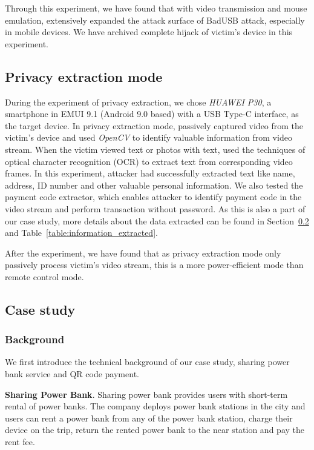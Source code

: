 Through this experiment, we have found that with video transmission and mouse emulation, \tool extensively expanded the attack surface of BadUSB attack, especially in mobile devices. We have archived complete hijack of victim's device in this experiment.

\subsection{Privacy extraction mode}
During the experiment of privacy extraction, we chose \textit{HUAWEI P30}, a smartphone in EMUI 9.1 (Android 9.0 based) with a USB Type-C interface, as the target device.
In privacy extraction mode, \tool passively captured video from the victim's device and used \textit{OpenCV} to identify valuable information from video stream.
When the victim viewed text or photos with text, \tool used the techniques of optical character recognition (OCR) to extract text from corresponding video frames.
In this experiment, attacker had successfully extracted text like name, address, ID number and other valuable personal information. We also tested the payment code extractor, which enables attacker to identify payment code in the video stream and perform transaction without password. As this is also a part of our case study, more details about the data extracted can be found in Section~\ref{subsec:case_study} and Table~\ref{table:information_extracted}.

After the experiment, we have found that as privacy extraction mode only passively process victim's video stream, this is a more power-efficient mode than remote control mode.

\subsection{Case study}
\label{subsec:case_study}
\subsubsection{Background}
We first introduce the technical background of our case study, sharing power bank service and QR code payment.

\textbf{Sharing Power Bank}.
Sharing power bank provides users with short-term rental of power banks.
The company deploys power bank stations in the city and users can rent a power bank from any of the power bank station, charge their device on the trip, return the rented power bank to the near station and pay the rent fee.

